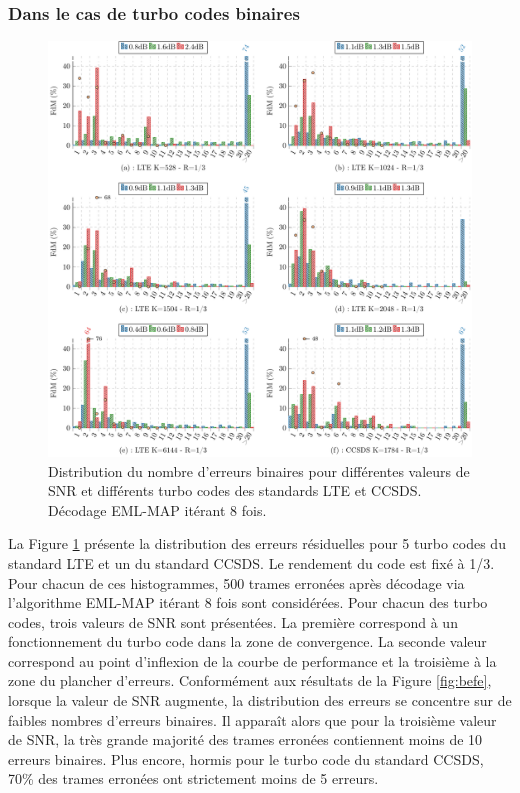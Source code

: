 \subsubsection{Dans le cas de turbo codes binaires}
\begin{figure}[!ht]
	\centering
	\hspace*{-1cm}
	\includegraphics[width=1.07\textwidth]{main/ch3_fig/be/tikz/be.pdf}
	\caption{Distribution du nombre d'erreurs binaires pour différentes valeurs de SNR et différents turbo codes des 
	standards LTE et CCSDS. 
	Décodage EML-MAP itérant 8 fois. \label{fig:be}}
\end{figure}

La Figure \ref{fig:be} présente la distribution des erreurs résiduelles pour 5 turbo codes du standard LTE et un du 
standard CCSDS. Le rendement du code est fixé à 1/3. Pour chacun de ces histogrammes, 500 trames erronées
après décodage via l'algorithme EML-MAP itérant 8 fois sont considérées. 
Pour chacun des turbo codes, trois valeurs de SNR sont présentées. La première correspond à un fonctionnement du turbo 
code dans la zone de convergence. La seconde valeur correspond au point d'inflexion de la courbe de performance et la troisième à la
zone du plancher d'erreurs. Conformément aux résultats de la Figure \ref{fig:befe}, lorsque la valeur de SNR augmente, la 
distribution des erreurs se concentre sur de faibles nombres d'erreurs binaires.
Il apparaît alors que pour la troisième valeur de SNR, la très grande majorité 
des trames erronées contiennent moins de 10 erreurs binaires. 
Plus encore, hormis pour le turbo code du standard CCSDS, 70\% des trames erronées ont strictement moins de 5 erreurs.

